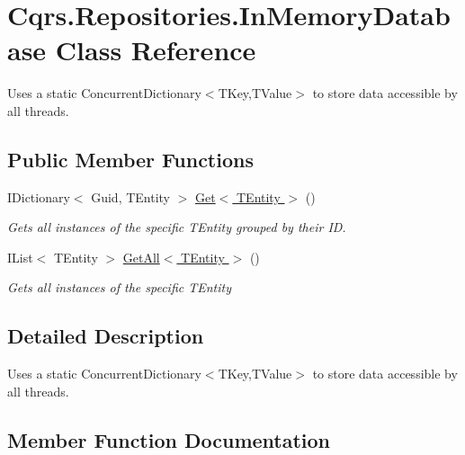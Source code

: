 \hypertarget{classCqrs_1_1Repositories_1_1InMemoryDatabase}{}\section{Cqrs.\+Repositories.\+In\+Memory\+Database Class Reference}
\label{classCqrs_1_1Repositories_1_1InMemoryDatabase}


Uses a static Concurrent\+Dictionary$<$\+T\+Key,\+T\+Value$>$ to store data accessible by all threads.  


\subsection*{Public Member Functions}
\begin{DoxyCompactItemize}
\item 
I\+Dictionary$<$ Guid, T\+Entity $>$ \hyperlink{classCqrs_1_1Repositories_1_1InMemoryDatabase_aef212725bb71dfe3a380de20843ed0e5_aef212725bb71dfe3a380de20843ed0e5}{Get$<$ T\+Entity $>$} ()
\begin{DoxyCompactList}\small\item\em Gets all instances of the specific {\itshape T\+Entity}  grouped by their ID. \end{DoxyCompactList}\item 
I\+List$<$ T\+Entity $>$ \hyperlink{classCqrs_1_1Repositories_1_1InMemoryDatabase_a83104b325c203f6768bb8ffd2c9c3381_a83104b325c203f6768bb8ffd2c9c3381}{Get\+All$<$ T\+Entity $>$} ()
\begin{DoxyCompactList}\small\item\em Gets all instances of the specific {\itshape T\+Entity}  \end{DoxyCompactList}\end{DoxyCompactItemize}


\subsection{Detailed Description}
Uses a static Concurrent\+Dictionary$<$\+T\+Key,\+T\+Value$>$ to store data accessible by all threads. 



\subsection{Member Function Documentation}
\mbox{\label{classCqrs_1_1Repositories_1_1InMemoryDatabase_aef212725bb71dfe3a380de20843ed0e5_aef212725bb71dfe3a380de20843ed0e5}} 
